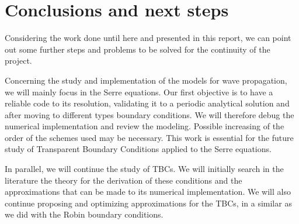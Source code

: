 \section{Conclusions and next steps}

\indent Considering the work done until here and presented in this report, we can point out some further steps and problems to be solved for the continuity of the project.

\indent Concerning the study and implementation of the models for wave propagation, we will mainly focus in the Serre equations. Our first objective is to have a reliable code to its resolution, validating it to a periodic analytical solution and after moving to different types boundary conditions. We will therefore debug the numerical implementation and review the modeling. Possible increasing of the order of the schemes used may be necessary. This work is essential for the future study of Transparent Boundary Conditions applied to the Serre equations.

\indent In parallel, we will continue the study of TBCs. We will initially search in the literature the theory for the derivation of these conditions and the approximations that can be made to its numerical implementation. We will also continue proposing and optimizing approximations for the TBCs, in a similar as we did with the Robin boundary conditions.